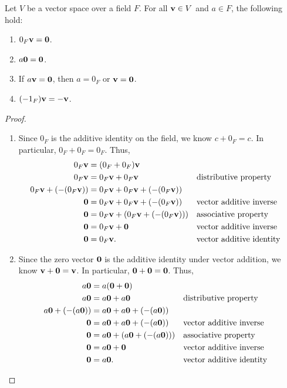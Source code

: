 \begin{theorem}\label{thm:vectprop}
Let $ V $ be a vector space over a field $ F $. For all $ \mathbf{v}\in V $ and $ a\in F $, the following hold:
\begin{enumerate}
    \item\label{thm:vectprop1} $ 0_F\mathbf{v}=\mathbf{0} $.
    \item\label{thm:vectprop2} $ a\mathbf{0}=\mathbf{0} $.
    \item\label{thm:vectprop3} If $ a\mathbf{v}=\mathbf{0} $, then $ a=0_F $ or $ \mathbf{v}=\mathbf{0} $.
    \item\label{thm:vectprop4} $ (-1_F)\mathbf{v}=-\mathbf{v} $.
\end{enumerate}
\end{theorem}
\begin{proof}~
\begin{enumerate}
    \item Since $ 0_F $ is the additive identity on the field, we know $ c+0_F=c $. In particular, $ 0_F+0_F=0_F $. Thus,
    \begin{align*}
        0_F\mathbf{v} &= (0_F+0_F)\mathbf{v} \\
        0_F\mathbf{v} &= 0_F\mathbf{v}+0_F\mathbf{v} && \text{distributive property} \\
        0_F\mathbf{v}+(-(0_F\mathbf{v})) &= 0_F\mathbf{v}+0_F\mathbf{v}+(-(0_F\mathbf{v})) \\
        \mathbf{0} &= 0_F\mathbf{v}+0_F\mathbf{v}+(-(0_F\mathbf{v})) && \text{vector additive inverse} \\
        \mathbf{0} &= 0_F\mathbf{v}+(0_F\mathbf{v}+(-(0_F\mathbf{v}))) && \text{associative property} \\
        \mathbf{0} &= 0_F\mathbf{v}+\mathbf{0} && \text{vector additive inverse} \\
        \mathbf{0} &= 0_F\mathbf{v}. && \text{vector additive identity}
    \end{align*}

    \item Since the zero vector $ \mathbf{0} $ is the additive identity under vector addition, we know $ \mathbf{v}+\mathbf{0}=\mathbf{v} $. In particular, $ \mathbf{0}+\mathbf{0}=\mathbf{0} $. Thus,
    \begin{align*}
        a\mathbf{0} &= a(\mathbf{0}+\mathbf{0}) \\
        a\mathbf{0} &= a\mathbf{0}+a\mathbf{0} && \text{distributive property} \\
        a\mathbf{0}+(-(a\mathbf{0})) &= a\mathbf{0}+a\mathbf{0}+(-(a\mathbf{0})) \\
        \mathbf{0} &= a\mathbf{0}+a\mathbf{0}+(-(a\mathbf{0})) && \text{vector additive inverse} \\
        \mathbf{0} &= a\mathbf{0}+(a\mathbf{0}+(-(a\mathbf{0}))) && \text{associative property} \\
        \mathbf{0} &= a\mathbf{0}+\mathbf{0} && \text{vector additive inverse} \\
        \mathbf{0} &= a\mathbf{0}. && \text{vector additive identity}
    \end{align*}


\end{enumerate}
\end{proof}
